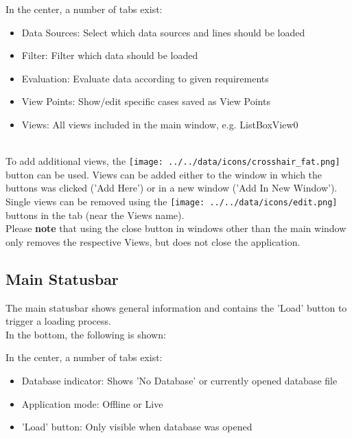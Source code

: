 In the center, a number of tabs exist:
\begin{itemize}
 \item Data Sources: Select which data sources and lines should be loaded
 \item Filter: Filter which data should be loaded
 \item Evaluation: Evaluate data according to given requirements
 \item View Points: Show/edit specific cases saved as View Points
 \item Views: All views included in the main window, e.g. ListBoxView0
\end{itemize}
\  \\

To add additional views, the \texttt{[image: ../../data/icons/crosshair\_fat.png]} button can be used. Views can be added either to the window in which the buttons was clicked ('Add Here') or in a new window ('Add In New Window'). \\

Single views can be removed using the \texttt{[image: ../../data/icons/edit.png]} buttons in the tab (near the Views name). \\

Please \textbf{note} that using the close button in windows other than the main window only removes the respective Views, but does not close the application.

\subsection{Main Statusbar}

The main statusbar shows general information and contains the 'Load' button to trigger a loading process. \\

In the bottom, the following is shown:

In the center, a number of tabs exist:
\begin{itemize}
 \item Database indicator: Shows 'No Database' or currently opened database file
 \item Application mode: Offline or Live
 \item 'Load' button: Only visible when database was opened
\end{itemize}
\  \\






